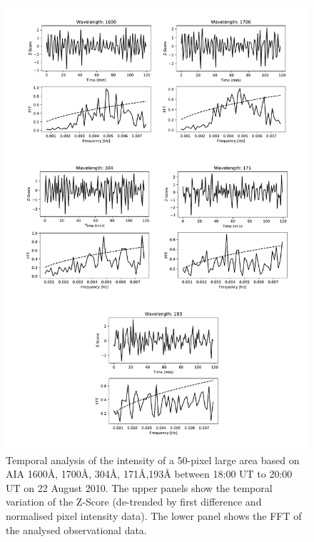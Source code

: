 \documentclass[physics,article,submit,pdftex,moreauthors]{Definitions/mdpi}
\begin{document}
\begin{figure}
    \centering
    \label{fft_sim}
    \includegraphics[scale=0.55]{QS_FFT.pdf}
    \caption{Temporal analysis of the intensity of a 50-pixel large area based on AIA 1600{\AA}, 1700{\AA}, 304{\AA}, 171{\AA},193{\AA} between 18:00 UT to 20:00 UT on 22 August 2010. The upper panels show the temporal variation of the Z-Score (de-trended by first difference and normalised pixel intensity data). The lower panel shows the FFT of the analysed observational data.}
\end{figure}

\end{document}
